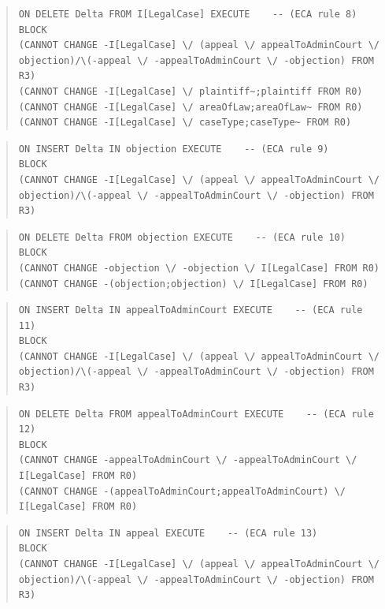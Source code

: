 \documentclass[10pt,a4paper]{report}              %
\theoremstyle{plain}\theorembodyfont{\rmfamily}\newtheorem{definition}{Definition}[section]
\theoremstyle{plain}\theorembodyfont{\rmfamily}\newtheorem{designrule}[definition]{Requirement}
\begin{document}
\begin{quote}
\begin{verbatim}
ON DELETE Delta FROM I[LegalCase] EXECUTE    -- (ECA rule 8)
BLOCK
(CANNOT CHANGE -I[LegalCase] \/ (appeal \/ appealToAdminCourt \/ objection)/\(-appeal \/ -appealToAdminCourt \/ -objection) FROM R3)
(CANNOT CHANGE -I[LegalCase] \/ plaintiff~;plaintiff FROM R0)
(CANNOT CHANGE -I[LegalCase] \/ areaOfLaw;areaOfLaw~ FROM R0)
(CANNOT CHANGE -I[LegalCase] \/ caseType;caseType~ FROM R0)
\end{verbatim}
\end{quote}
\begin{quote}
\begin{verbatim}
ON INSERT Delta IN objection EXECUTE    -- (ECA rule 9)
BLOCK
(CANNOT CHANGE -I[LegalCase] \/ (appeal \/ appealToAdminCourt \/ objection)/\(-appeal \/ -appealToAdminCourt \/ -objection) FROM R3)
\end{verbatim}
\end{quote}
\begin{quote}
\begin{verbatim}
ON DELETE Delta FROM objection EXECUTE    -- (ECA rule 10)
BLOCK
(CANNOT CHANGE -objection \/ -objection \/ I[LegalCase] FROM R0)
(CANNOT CHANGE -(objection;objection) \/ I[LegalCase] FROM R0)
\end{verbatim}
\end{quote}
\begin{quote}
\begin{verbatim}
ON INSERT Delta IN appealToAdminCourt EXECUTE    -- (ECA rule 11)
BLOCK
(CANNOT CHANGE -I[LegalCase] \/ (appeal \/ appealToAdminCourt \/ objection)/\(-appeal \/ -appealToAdminCourt \/ -objection) FROM R3)
\end{verbatim}
\end{quote}
\begin{quote}
\begin{verbatim}
ON DELETE Delta FROM appealToAdminCourt EXECUTE    -- (ECA rule 12)
BLOCK
(CANNOT CHANGE -appealToAdminCourt \/ -appealToAdminCourt \/ I[LegalCase] FROM R0)
(CANNOT CHANGE -(appealToAdminCourt;appealToAdminCourt) \/ I[LegalCase] FROM R0)
\end{verbatim}
\end{quote}
\begin{quote}
\begin{verbatim}
ON INSERT Delta IN appeal EXECUTE    -- (ECA rule 13)
BLOCK
(CANNOT CHANGE -I[LegalCase] \/ (appeal \/ appealToAdminCourt \/ objection)/\(-appeal \/ -appealToAdminCourt \/ -objection) FROM R3)
\end{verbatim}
\end{quote}
\end{document}
